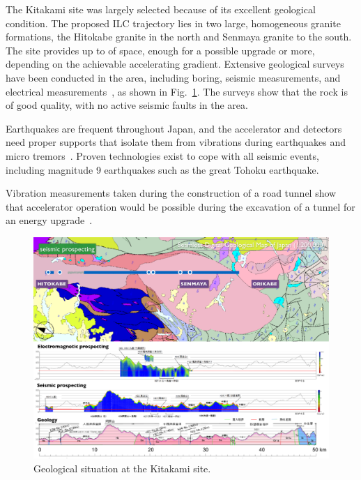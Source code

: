 The Kitakami site was largely selected because of its excellent geological condition. 
The proposed ILC trajectory lies in two large, homogeneous granite formations, the Hitokabe granite in the north and Senmaya granite to the south.
The site provides up to  of space, enough for a possible  upgrade or more, depending on the achievable accelerating gradient.  
Extensive geological surveys have been conducted in the area, including boring, seismic measurements, and electrical measurements~\cite{Sanuki:2015a}, as shown in Fig.~\ref{fig:kitakami-geology}.
The surveys show that the rock is of good quality, with no active seismic faults in the area.

Earthquakes are frequent throughout Japan, and the accelerator and detectors need  proper supports that isolate them from vibrations during earthquakes and micro tremors~\cite{Sanuki:2018b}. 
Proven technologies exist to cope with all seismic events, including magnitude 9 earthquakes such as the great Tohoku earthquake. 


Vibration measurements taken during the construction of a road tunnel show that accelerator operation would be possible during the excavation of a tunnel for an energy upgrade~\cite{Sanuki:2018a}.



\begin{figure}[htbp]
   \includegraphics[width=\hsize]{chapters/figures/Kitakami_Geology}
\caption{Geological situation at the Kitakami site.}
\label{fig:kitakami-geology}
\end{figure}


